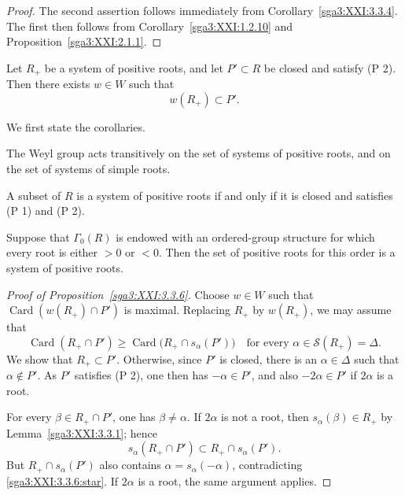 \begin{proof}
The second assertion follows immediately from
Corollary~\ref{sga3:XXI:3.3.4}. The first then follows from
Corollary~\ref{sga3:XXI:1.2.10} and
Proposition~\ref{sga3:XXI:2.1.1}.
\end{proof}

\begin{proposition}\label{sga3:XXI:3.3.6}
Let \(R_+\) be a system of positive roots, and let \(P'\subset R\) be
closed and satisfy (P 2). Then there exists \(w\in W\) such that
\[
 w(R_+)\subset P'.
\]
\end{proposition}

We first state the corollaries.

\begin{corollary}\label{sga3:XXI:3.3.7}
The Weyl group acts transitively on the set of systems of positive
roots, and on the set of systems of simple roots.
\end{corollary}

\begin{corollary}\label{sga3:XXI:3.3.8}
A subset of \(R\) is a system of positive roots if and only if it is
closed and satisfies (P 1) and (P 2).
\end{corollary}

\begin{corollary}\label{sga3:XXI:3.3.9}
Suppose that \(\Gamma_0(R)\) is endowed with an ordered-group
structure for which every root is either \(>0\) or \(<0\). Then the
set of positive roots for this order is a system of positive roots.
\end{corollary}


\begin{proof}[Proof of Proposition~\ref{sga3:XXI:3.3.6}]
Choose \(w\in W\) such that
\(\operatorname{Card}(w(R_+)\cap P')\) is maximal. Replacing \(R_+\)
by \(w(R_+)\), we may assume that
\begin{equation}
 \operatorname{Card}(R_+\cap P')
 \geq
 \operatorname{Card}\bigl(R_+\cap s_\alpha(P')\bigr)
 \quad\text{for every }\alpha\in\mathscr{S}(R_+)=\Delta.
 \tag{\(\ast\)}\label{sga3:XXI:3.3.6:star}
\end{equation}
We show that \(R_+\subset P'\). Otherwise, since \(P'\) is closed,
there is an \(\alpha\in\Delta\) such that \(\alpha\notin P'\). As
\(P'\) satisfies (P 2), one then has \(-\alpha\in P'\), and also
\(-2\alpha\in P'\) if \(2\alpha\) is a root.

For every \(\beta\in R_+\cap P'\), one has \(\beta\neq\alpha\). If
\(2\alpha\) is not a root, then
\(s_\alpha(\beta)\in R_+\) by Lemma~\ref{sga3:XXI:3.3.1}; hence
\[
 s_\alpha(R_+\cap P')
 \subset R_+\cap s_\alpha(P').
\]
But \(R_+\cap s_\alpha(P')\) also contains
\(\alpha=s_\alpha(-\alpha)\), contradicting
\eqref{sga3:XXI:3.3.6:star}. If \(2\alpha\) is a root, the same
argument applies.
\end{proof}

